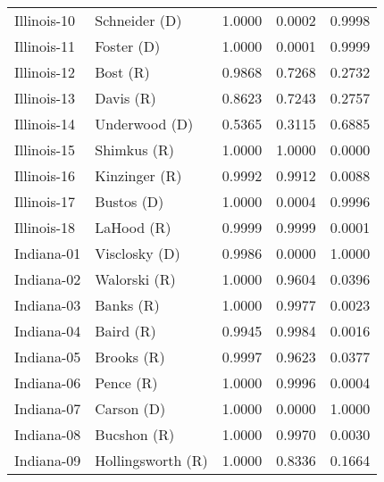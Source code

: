 \begin{longtable}{llrll}
       Illinois-10 &       {\color{Blue} Schneider (D)} &       1.0000 &        0.0002 &        0.9998 \\
       Illinois-11 &          {\color{Blue} Foster (D)} &       1.0000 &        0.0001 &        0.9999 \\
       Illinois-12 &             {\color{Red} Bost (R)} &       0.9868 &        0.7268 &        0.2732 \\
       Illinois-13 &            {\color{Red} Davis (R)} &       0.8623 &        0.7243 &        0.2757 \\
       Illinois-14 &       {\color{Blue} Underwood (D)} &       0.5365 &        0.3115 &        0.6885 \\
       Illinois-15 &          {\color{Red} Shimkus (R)} &       1.0000 &        1.0000 &        0.0000 \\
       Illinois-16 &        {\color{Red} Kinzinger (R)} &       0.9992 &        0.9912 &        0.0088 \\
       Illinois-17 &          {\color{Blue} Bustos (D)} &       1.0000 &        0.0004 &        0.9996 \\
       Illinois-18 &           {\color{Red} LaHood (R)} &       0.9999 &        0.9999 &        0.0001 \\
        Indiana-01 &       {\color{Blue} Visclosky (D)} &       0.9986 &        0.0000 &        1.0000 \\
        Indiana-02 &         {\color{Red} Walorski (R)} &       1.0000 &        0.9604 &        0.0396 \\
        Indiana-03 &            {\color{Red} Banks (R)} &       1.0000 &        0.9977 &        0.0023 \\
        Indiana-04 &            {\color{Red} Baird (R)} &       0.9945 &        0.9984 &        0.0016 \\
        Indiana-05 &           {\color{Red} Brooks (R)} &       0.9997 &        0.9623 &        0.0377 \\
        Indiana-06 &            {\color{Red} Pence (R)} &       1.0000 &        0.9996 &        0.0004 \\
        Indiana-07 &          {\color{Blue} Carson (D)} &       1.0000 &        0.0000 &        1.0000 \\
        Indiana-08 &          {\color{Red} Bucshon (R)} &       1.0000 &        0.9970 &        0.0030 \\
        Indiana-09 &    {\color{Red} Hollingsworth (R)} &       1.0000 &        0.8336 &        0.1664 \\

\end{longtable}
